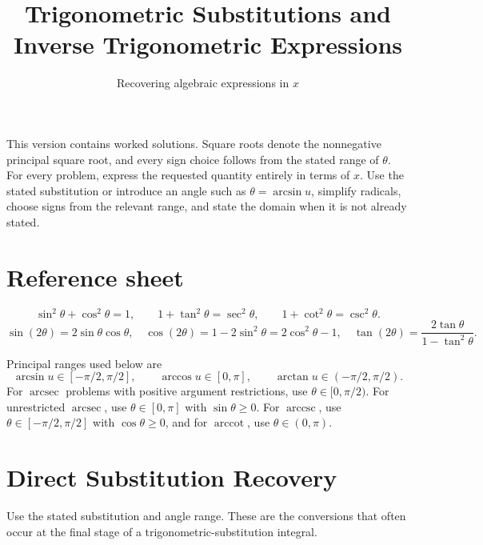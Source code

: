 \documentclass{worksheet}
\title{Trigonometric Substitutions and Inverse Trigonometric Expressions}
\subtitle{Recovering algebraic expressions in $x$}
\DeclareMathOperator{\arccsc}{arccsc}
\DeclareMathOperator{\arcsec}{arcsec}
\DeclareMathOperator{\arccot}{arccot}
\begin{document}
\maketitle

\ifshowsolutions
This version contains worked solutions. Square roots denote the nonnegative
principal square root, and every sign choice follows from the stated range of
$\theta$.
\else
For every problem, express the requested quantity entirely in terms of $x$.
Use the stated substitution or introduce an angle such as
$\theta=\arcsin u$, simplify radicals, choose signs from the relevant range,
and state the domain when it is not already stated.
\fi

\section*{Reference sheet}

\[
\sin^2\theta+\cos^2\theta=1,
\qquad 1+\tan^2\theta=\sec^2\theta,
\qquad 1+\cot^2\theta=\csc^2\theta.
\]
\[
\sin(2\theta)=2\sin\theta\cos\theta,
\quad
\cos(2\theta)=1-2\sin^2\theta=2\cos^2\theta-1,
\quad
\tan(2\theta)=\frac{2\tan\theta}{1-\tan^2\theta}.
\]

Principal ranges used below are
\[
\arcsin u\in[-\pi/2,\pi/2],\qquad
\arccos u\in[0,\pi],\qquad
\arctan u\in(-\pi/2,\pi/2).
\]
For $\arcsec$ problems with positive argument restrictions, use
$\theta\in[0,\pi/2)$. For unrestricted $\arcsec$, use
$\theta\in[0,\pi]$ with $\sin\theta\geq 0$. For $\arccsc$, use
$\theta\in[-\pi/2,\pi/2]$ with $\cos\theta\geq 0$, and for $\arccot$, use
$\theta\in(0,\pi)$.

\section{Direct Substitution Recovery}

Use the stated substitution and angle range. These are the conversions that
often occur at the final stage of a trigonometric-substitution integral.
\end{document}
